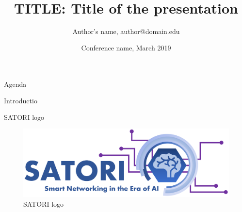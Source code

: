 \documentclass[aspectratio=169]{beamer}
\title{TITLE: Title of the presentation}
\author{Author's name, author@domain.edu}
\institute{University of affiliation}
\date{Conference name, March 2019}
\begin{document}
{
    \maketitle
}
\addtocounter{framenumber}{-1}


\begin{frame}{Agenda}
    \blindenumerate[5]
\end{frame}

\begin{frame}{Introductio}
    \blindenumerate[5]
\end{frame}

\begin{frame}{SATORI logo}
    \begin{figure}
        \centering
        \includegraphics[width=0.7\linewidth]{logos/satori-big-logo.pdf}
        \caption{SATORI logo}
        \label{fig:satori-logo}
    \end{figure}
\end{frame}

\end{document}

